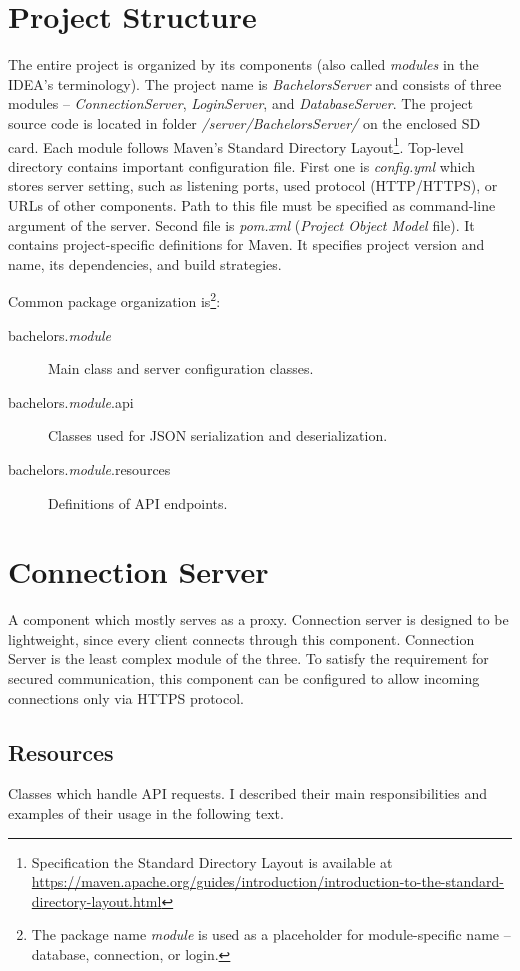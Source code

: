 \section{Project Structure}
The entire project is organized by its components (also called \textit{modules} in the IDEA's terminology). The project name is \textit{BachelorsServer} and consists of three modules -- \textit{ConnectionServer}, \textit{LoginServer}, and \textit{DatabaseServer}. The project source code is located in folder \textit{/server/BachelorsServer/} on the enclosed SD card. Each module follows Maven's Standard Directory Layout\footnote{Specification the Standard Directory Layout is available at \url{https://maven.apache.org/guides/introduction/introduction-to-the-standard-directory-layout.html}}. Top-level directory contains important configuration file. First one is \textit{config.yml} which stores server setting, such as listening ports, used protocol (HTTP/HTTPS), or URLs of other components. Path to this file must be specified as command-line argument of the server. Second file is \textit{pom.xml} (\textit{Project Object Model} file). It contains project-specific definitions for Maven. It specifies project version and name, its dependencies, and build strategies. 

Common package organization is\footnote{The package name \textit{module} is used as a placeholder for module-specific name -- database, connection, or login.}:
\begin{description}
	\item[bachelors.\textit{module}] Main class and server configuration classes.
	\item[bachelors.\textit{module}.api] Classes used for JSON serialization and deserialization.
	\item[bachelors.\textit{module}.resources] Definitions of API endpoints.
\end{description}

\section{Connection Server}
A component which mostly serves as a proxy. Connection server is designed to be lightweight, since every client connects through this component. Connection Server is the least complex module of the three. To satisfy the requirement for secured communication, this component can be configured to allow incoming connections only via HTTPS protocol.  

\subsection{Resources}
Classes which handle API requests. I described their main responsibilities and examples of their usage in the following text.

